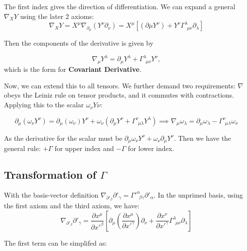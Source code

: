 \documentclass{article}
\begin{document}
The first index gives the direction of differentiation. We can expand a general $\nabla_XY$ using the later 2 axioms:
\begin{equation}
    \nabla_XY=X^\mu\nabla_{\partial_\mu}\left(Y^\nu\partial_\nu\right)=X^\mu\left[\left(\partial\mu Y^\nu\right)+Y^\nu\Gamma^\lambda_{~~\mu\nu}\partial_\lambda\right]
\end{equation}

Then the components of the derivative is given by

\begin{equation}
    \boxed{\nabla_\mu Y^\lambda = \partial_\mu Y^\lambda +\Gamma^\lambda_{~~\mu\nu}Y^\nu},
\end{equation}
which is the form for \textbf{Covariant Derivative}.

Now, we can extend this to all tensors. We further demand two requirements: $\nabla$ obeys the Leiniz rule on tensor products, and it commutes with contractions. Applying this to the scalar $\omega_\nu Y\nu$:

\begin{equation}
    \partial_\mu(\omega_\nu Y^\nu) = \partial_\mu(\omega_\nu)Y^\nu + \omega_\nu(\partial_\mu Y^\nu + \Gamma^\nu_{~~\mu\lambda}Y^\lambda)\implies \nabla_\mu \omega_\lambda = \partial_\mu \omega_\lambda - \Gamma^\nu_{~~\mu\lambda}\omega_\nu
\end{equation}

As the derivative for the scalar must be $\partial_\mu \omega_\nu Y^\nu + \omega_\nu \partial_\mu Y^\nu$. Then we have the general rule: $+\Gamma$ for upper index and $-\Gamma$ for lower index.

\subsection{Transformation of $\Gamma$}

With the basis-vector definition $\nabla_{\partial'_\beta} \partial'_\gamma = \Gamma'^\alpha_{~~\beta\gamma}\partial'_\alpha$. In the unprimed basis, using the first axiom and the third axiom, we have:
\begin{equation}
    \nabla_{\partial'_\beta}\partial'_\gamma = \frac{\partial x^\mu}{\partial x'^\beta}\left[\partial_\mu \left(\frac{\partial x^\mu}{\partial x'^\gamma}\right)\partial_\nu + \frac{\partial x^\nu}{\partial x'^\gamma}\Gamma^\lambda_{~~\mu\nu}\partial_\lambda\right]
\end{equation}

The first term can be simplifed as:
\end{document}
